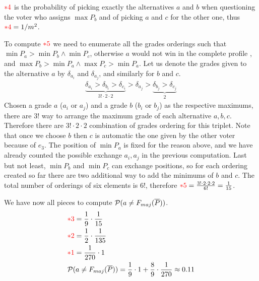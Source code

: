 \documentclass[version=3.21, pagesize, twoside=off, bibliography=totoc, DIV=calc, fontsize=12pt, a4paper]{scrartcl}
\begin{document}
${\color{red}*4}$ is the probability of picking exactly the alternatives $a$ and $b$ when questioning the voter who assigns $\max{P_{b}}$ and of picking $a$ and $c$ for the other one, thus ${\color{red}*4}=1/m^2$. 

To compute ${\color{red}*5}$ we need to enumerate all the grades orderings such that $\min{P_{a}}>\min{P_{b}}\wedge \min{P_{c}}$, otherwise $a$ would not win in the complete profile , and $\max{P_{b}}>\min{P_{a}}\wedge \max{P_{c}}>\min{P_{a}}$. Let us denote the grades given to the alternative $a$ by $\delta_{a_i}$ and $\delta_{a_j}$, and similarly for $b$ and $c$.
\begin{align}
	\underbrace{\delta_{a_i}>\delta_{b_i}>\delta_{c_i}}_{3!\cdot 2\cdot 2}>\delta_{a_j}>\underbrace{\delta_{b_j}>\delta_{c_j}}_{2}
\end{align}
Chosen a grade $a$ ($a_i$ or $a_j$) and a grade $b$ ($b_i$ or $b_j$) as the respective maximums, there are $3!$ way to arrange the maximum grade of each alternative $a, b, c$. Therefore there are $3! \cdot 2 \cdot 2$ combination of grades ordering for this triplet. Note that once we choose $b$ then $c$ is automatic the one given by the other voter because of $e_3$. The position of $\min{P_{a}}$ is fixed for the reason above, and we have already counted the possible exchange $a_i, a_j$ in the previous computation. Last but not least, $\min{P_{b}}$ and $\min{P_{c}}$ can exchange positions, so for each ordering created so far there are two additional way to add the minimums of $b$ and $c$. The total number of orderings of six elements is $6!$, therefore ${\color{red}*5}= \frac{3!\cdot 2\cdot 2\cdot2}{6!}=\frac{1}{15}$.

We have now all pieces to compute $\mathcal{P}(a\neq F_{maj}(\overline{P}))$. 
\begin{align}
	&{\color{red}*3} = \frac{1}{9} \cdot \frac{1}{15} \\
	&{\color{red}*2} =\frac{1}{2} \cdot \frac{1}{135} \\
	&{\color{red}*1} =\frac{1}{270} \cdot 1 \\
	&\mathcal{P}(a\neq F_{maj}(\overline{P})) = \frac{1}{9} \cdot 1 + \frac{8}{9} \cdot \frac{1}{270} \approx 0.11
\end{align}
\end{document}
